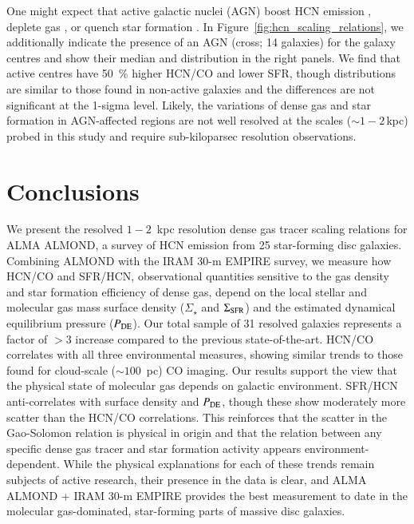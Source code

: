 \documentclass[letter, longauth]{aa} %
\begin{document}
One might expect that active galactic nuclei (AGN) boost HCN emission \citep[e.g.,][]{Goldsmith2018, Matsushita2015}, deplete gas \citep[e.g.][]{Ellison2021}, or quench star formation \citep[e.g.,][]{Nelson2019}.
In Figure~\ref{fig:hcn_scaling_relations}, we additionally indicate the presence of an AGN (cross; 14 galaxies) for the galaxy centres and show their median and distribution in the right panels.
We find that active centres have \SI{50}{\percent} higher HCN/CO and lower SFR, though distributions are similar to those found in non-active galaxies and the differences are not significant at the 1-sigma level.
Likely, the variations of dense gas and star formation in AGN-affected regions are not well resolved at the scales ($\sim 1-2\,$kpc) probed in this study and require sub-kiloparsec resolution observations.


\section{Conclusions}
\label{sec:conclusions}

We present the resolved $1{-}2$~kpc resolution dense gas tracer scaling relations for ALMA ALMOND, a survey of HCN emission from 25 star-forming disc galaxies. 
Combining ALMOND with the IRAM 30-m EMPIRE survey, we measure how HCN/CO and SFR/HCN, observational quantities sensitive to the gas density and star formation efficiency of dense gas, depend on the local stellar and molecular gas mass surface density ($\Sigma_\star$ and $\Sigma_{\rm SFR}$) and the estimated dynamical equilibrium pressure ($P_{\rm DE}$). 
Our total sample of 31 resolved galaxies represents a factor of $>3$ increase compared to the previous state-of-the-art. 
HCN/CO correlates with all three environmental measures, showing similar trends to those found for cloud-scale ($\sim 100$~pc) CO imaging. 
Our results support the view that the physical state of molecular gas depends on galactic environment. SFR/HCN anti-correlates with surface density and $P_{\rm DE}$, though these show moderately more scatter than the HCN/CO correlations. This reinforces that the scatter in the Gao-Solomon relation is physical in origin and that the relation between any specific dense gas tracer and star formation activity appears environment-dependent. While the physical explanations for each of these trends remain subjects of active research, their presence in the data is clear, and ALMA ALMOND + IRAM 30-m EMPIRE provides the best measurement to date in the molecular gas-dominated, star-forming parts of massive disc galaxies.
\end{document}
